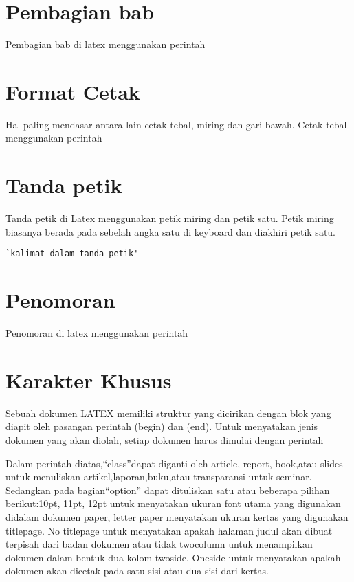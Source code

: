 \section{Pembagian bab}
Pembagian bab di latex menggunakan perintah 


\section{Format Cetak}
Hal paling mendasar antara lain cetak tebal, miring dan gari bawah. Cetak tebal menggunakan perintah 

\section{Tanda petik}
Tanda petik di Latex menggunakan petik miring dan petik satu. Petik miring biasanya berada pada sebelah angka satu di keyboard dan diakhiri petik satu.

\begin{lstlisting}[caption=Contoh kalimat dalam tanda petik di Latex,label={lst:tandapetik}]
`kalimat dalam tanda petik'
\end{lstlisting}

\section{Penomoran}
Penomoran di latex menggunakan perintah 

\section{Karakter Khusus}

Sebuah dokumen LATEX memiliki struktur yang dicirikan dengan blok yang diapit oleh pasangan perintah (begin) dan (end). Untuk menyatakan jenis dokumen yang akan diolah, setiap dokumen harus dimulai dengan perintah


Dalam perintah diatas,“class”dapat diganti oleh article, report, book,atau slides untuk menuliskan artikel,laporan,buku,atau transparansi untuk seminar. Sedangkan pada bagian“option” dapat dituliskan satu atau beberapa pilihan berikut:10pt, 11pt, 12pt untuk menyatakan ukuran font utama yang digunakan didalam dokumen paper, letter paper menyatakan ukuran kertas yang digunakan titlepage. No titlepage untuk menyatakan apakah halaman judul akan dibuat terpisah dari badan dokumen atau tidak twocolumn untuk menampilkan dokumen dalam bentuk dua kolom twoside. Oneside untuk menyatakan apakah dokumen akan dicetak pada satu sisi atau dua sisi dari kertas.



